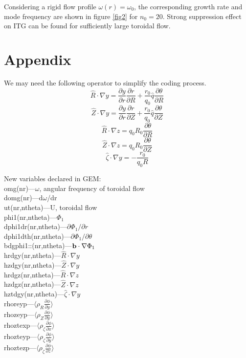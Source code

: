 \documentclass[12pt]{article}
\begin{document}
\begin{CJK*}{UTF8}{gbsn}
Considering a rigid flow profile $\omega(r)=\omega_0$, the corresponding growth rate and mode frequency are shown in 
figure \ref{fig2} for $n_0=20$. Strong suppression effect on ITG can be found for sufficiently large toroidal flow. 


\newpage
\section*{Appendix}\label{app}
We may need the following operator to simplify the coding process.
\begin{equation*}
    \hat{R}\cdot\nabla y = \frac{\partial y}{\partial r}\frac{\partial r}{\partial R} + \frac{r_0}{q_0}\hat{q}\frac{\partial \theta}{\partial R}
\end{equation*}
\begin{equation*}
    \hat{Z}\cdot\nabla y = \frac{\partial y}{\partial r}\frac{\partial r}{\partial Z} + \frac{r_0}{q_0}\hat{q}\frac{\partial \theta}{\partial Z}
\end{equation*}
\begin{equation*}
    \hat{R}\cdot\nabla z = q_0R_0\frac{\partial \theta}{\partial R}
\end{equation*}
\begin{equation*}
    \hat{Z}\cdot\nabla z = q_0R_0\frac{\partial \theta}{\partial Z}
\end{equation*}
\begin{equation*}
    \hat{\zeta}\cdot\nabla y = -\frac{r_0}{q_0R}
\end{equation*}

New variables declared in GEM:\\
omg(nr)---$\omega$, angular frequency of toroidal flow\\
domg(nr)---d$\omega$/dr\\
ut(nr,ntheta)---U, toroidal flow\\
phi1(nr,ntheta)---$\Phi_1$\\
dphi1dr(nr,ntheta)---$\partial\Phi_1/\partial r$\\
dphi1dth(nr,ntheta)---$\partial\Phi_1/\partial \theta$\\
bdgphi1::(nr,ntheta)---${\bf b}\cdot\nabla{\rm \Phi_1}$\\
hrdgy(nr,ntheta)---$\hat{R}\cdot\nabla y$\\
hzdgy(nr,ntheta)---$\hat{Z}\cdot\nabla y$\\
hrdgz(nr,ntheta)---$\hat{R}\cdot\nabla z$\\
hzdgz(nr,ntheta)---$\hat{Z}\cdot\nabla z$\\
hztdgy(nr,ntheta)---$\hat{\zeta}\cdot\nabla y$\\
rhoreyp---$\big\langle\rho_R\frac{\partial\phi}{\partial y}\big\rangle$\\
rhozeyp---$\big\langle\rho_Z\frac{\partial\phi}{\partial y}\big\rangle$\\
rhoztexp---$\big\langle\rho_\zeta\frac{\partial\phi}{\partial x}\big\rangle$\\
rhozteyp---$\big\langle\rho_\zeta\frac{\partial\phi}{\partial y}\big\rangle$\\
rhoztezp---$\big\langle\rho_\zeta\frac{\partial\phi}{\partial z}\big\rangle$\\

\newpage


\end{CJK*}
\end{document}
